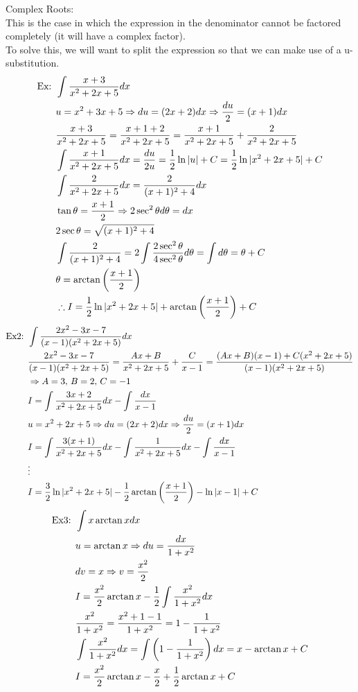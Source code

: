 \documentclass[11pt, fleqn]{article}
\begin{document}
Complex Roots:\\
This is the case in which the expression in the denominator cannot be factored completely (it will have a complex factor).\\
To solve this, we will want to split the expression so that we can make use of a u-substitution.
\begin{align*}
    \text{Ex: }&\int\frac{x+3}{x^2+2x+5}dx\\
    &u=x^2+3x+5\Rightarrow du=(2x+2)dx\Rightarrow \frac{du}{2}=(x+1)dx\\
    &\frac{x+3}{x^2+2x+5}=\frac{x+1+2}{x^2+2x+5}=\frac{x+1}{x^2+2x+5}+\frac{2}{x^2+2x+5}\\
    &\int\frac{x+1}{x^2+2x+5}dx=\frac{du}{2u}=\frac{1}{2}\ln|u|+C=\frac{1}{2}\ln|x^2+2x+5|+C\\
    &\int\frac{2}{x^2+2x+5}dx=\frac{2}{(x+1)^2+4}dx\\
    &\tan\theta=\frac{x+1}{2}\Rightarrow 2\sec^2\theta d\theta=dx\\
    &2\sec\theta=\sqrt{(x+1)^2+4}\\
    &\int\frac{2}{(x+1)^2+4}=2\int\frac{2\sec^2\theta}{4\sec^2\theta}d\theta=\int d\theta=\theta+C\\
    &\theta=\arctan\left( \frac{x+1}{2} \right)\\
    &\therefore I=\frac{1}{2}\ln|x^2+2x+5|+\arctan\left( \frac{x+1}{2} \right)+C
\end{align*}
\begin{align*}
    \text{Ex2: }&\int\frac{2x^2-3x-7}{(x-1)(x^2+2x+5)}dx\\
    &\frac{2x^2-3x-7}{(x-1)(x^2+2x+5)}=\frac{Ax+B}{x^2+2x+5}+\frac{C}{x-1}=\frac{(Ax+B)(x-1)+C(x^2+2x+5)}{(x-1)(x^2+2x+5)}\\
    &\Rightarrow A=3,\,B=2,\,C=-1\\
    &I=\int\frac{3x+2}{x^2+2x+5}dx-\int\frac{dx}{x-1}\\
    &u=x^2+2x+5\Rightarrow du=(2x+2)dx\Rightarrow \frac{du}{2}=(x+1)dx\\
    &I=\int\frac{3(x+1)}{x^2+2x+5}dx-\int\frac{1}{x^2+2x+5}dx-\int\frac{dx}{x-1}\\
    &\vdots\\
    &I=\frac{3}{2}\ln|x^2+2x+5|-\frac{1}{2}\arctan\left( \frac{x+1}{2} \right)-\ln|x-1|+C
\end{align*}
\begin{align*}
    \text{Ex3: }&\int x\arctan xdx\\
    &u=\arctan x\Rightarrow du=\frac{dx}{1+x^2}\\
    &dv=x\Rightarrow v=\frac{x^2}{2}\\
    &I=\frac{x^2}{2}\arctan x-\frac{1}{2}\int\frac{x^2}{1+x^2}dx\\
    &\frac{x^2}{1+x^2}=\frac{x^2+1-1}{1+x^2}=1-\frac{1}{1+x^2}\\
    &\int\frac{x^2}{1+x^2}dx=\int\left( 1-\frac{1}{1+x^2} \right)dx=x-\arctan x +C\\
    &I=\frac{x^2}{2}\arctan x-\frac{x}{2}+\frac{1}{2}\arctan x+C
\end{align*}
\end{document}
